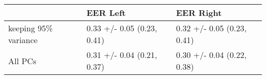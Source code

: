 \begin{tabular}{lll}
\toprule
{} &                    EER Left &                   EER Right \\
\midrule
keeping 95\% variance &  0.33 +/- 0.05 (0.23, 0.41) &  0.32 +/- 0.05 (0.23, 0.41) \\
All PCs              &  0.31 +/- 0.04 (0.21, 0.37) &  0.30 +/- 0.04 (0.22, 0.38) \\
\bottomrule
\end{tabular}
